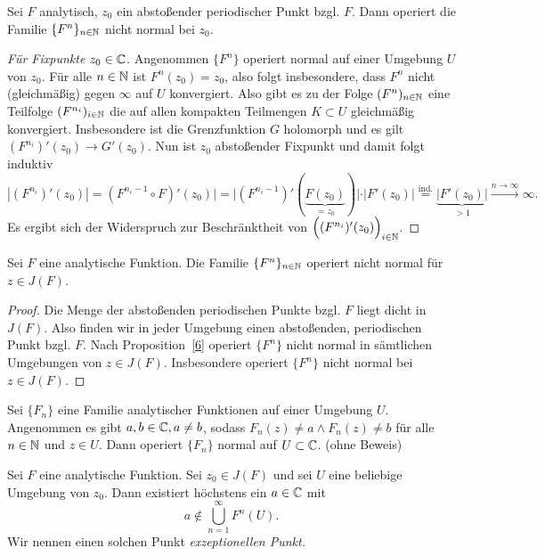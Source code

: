 \documentclass{mywork}
\begin{document}
\begin{prop}\label{6}
Sei $F$ analytisch, $z_0$ ein abstoßender periodischer Punkt bzgl. $F$. Dann operiert die Familie $\{F^n\}_{n\in \mathbb{N}}$ nicht normal bei $z_0$.
\end{prop}
\begin{proof}[Für Fixpunkte $z_0\in \mathbb{C}$]
 Angenommen $\{F^n\}$ operiert normal auf einer Umgebung $U$ von $z_0$. Für alle $n\in \mathbb{N}$ ist $F^n(z_0)=z_0$, also folgt insbesondere, dass $F^n$ nicht (gleichmäßig) gegen $\infty$ auf $U$ konvergiert. Also gibt es zu der Folge $(F^n)_{n\in \mathbb{N}}$ eine Teilfolge $(F^{n_i})_{i\in \mathbb{N}}$ die auf allen kompakten Teilmengen $K\subset U$ gleichmäßig konvergiert. Insbesondere ist die Grenzfunktion $G$ holomorph und es gilt $(F^{n_i})'(z_0) \to G'(z_0)$. Nun ist $z_0$ abstoßender Fixpunkt und damit folgt induktiv
 \[
 	|(F^{n_i})'(z_0)|=(F^{n_i-1} \circ F)'(z_0)|=|(F^{n_i-1})'(\underbrace{F(z_0)}_{=z_0})|\cdot |F'(z_0)| \stackrel{\text{ind.}}{=} \underbrace{|F'(z_0)|}_{>1} \stackrel{n\to \infty}\to \infty.
 \]
 Es ergibt sich der Widerspruch zur Beschränktheit von $\Big((F^{n_i})'(z_0)\Big)_{i\in \mathbb{N}}$.
\end{proof}



\begin{kor} \label{7}
Sei $F$ eine analytische Funktion. Die Familie $\{F^n\}_{n\in \mathbb{N}}$ operiert nicht normal für $z\in J(F)$.
\end{kor}

\begin{proof}
Die Menge der abstoßenden periodischen Punkte bzgl. $F$ liegt dicht in $J(F)$. Also finden wir in jeder Umgebung einen abstoßenden, periodischen Punkt bzgl. $F$. Nach Proposition~\ref{6} operiert $\{F^n\}$ nicht normal in sämtlichen Umgebungen von $z\in J(F)$. Insbesondere operiert $\{F^n\}$ nicht normal bei $z\in J(F)$.
\end{proof}

\begin{thm} \label{8}
Sei $\{F_n\}$ eine Familie analytischer Funktionen auf einer Umgebung $U$. Angenommen es gibt $a,b \in \mathbb{C}, a\neq b$, sodass $F_n(z)\neq a \land F_n(z)\neq b$ für alle $n\in \mathbb{N}$ und $z\in U$. Dann operiert $\{F_n\}$ normal auf $U\subset \mathbb{C}$. (ohne Beweis) 
\end{thm}

\begin{kor} \label{9}
Sei $F$ eine analytische Funktion. Sei $z_0\in J(F)$ und sei $U$ eine beliebige Umgebung von $z_0$. Dann existiert höchstens ein $a\in \mathbb{C}$ mit
\[
	a\not\in \bigcup_{n=1}^\infty F^n(U).
\]
Wir nennen einen solchen Punkt \emph{exzeptionellen Punkt.}
\end{kor}
\end{document}
